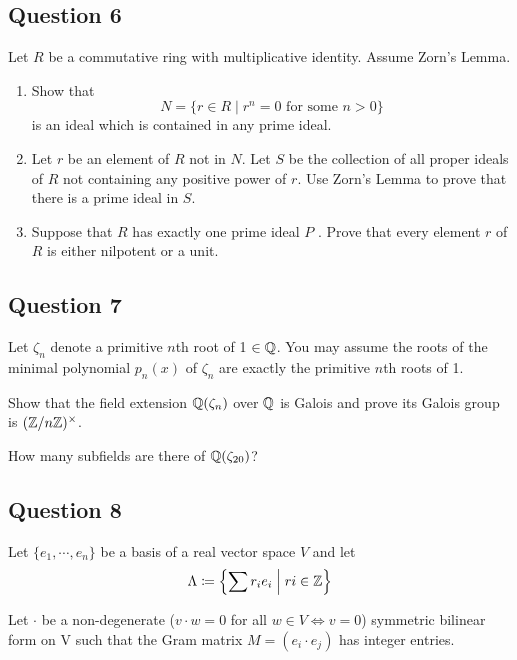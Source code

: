 \documentclass[12pt]{article}
\begin{document}
\hypertarget{question-6}{%
\subsection{Question 6}\label{question-6}}

Let \(R\) be a commutative ring with multiplicative identity. Assume
Zorn's Lemma.

\begin{enumerate}
\def\labelenumi{(\alph{enumi})}
\item
  Show that \[
  N = \{r \in R \mid r^n = 0 \text{ for some } n > 0\}
  \] is an ideal which is contained in any prime ideal.
\item
  Let \(r\) be an element of \(R\) not in \(N\). Let \(S\) be the
  collection of all proper ideals of \(R\) not containing any positive
  power of \(r\). Use Zorn's Lemma to prove that there is a prime ideal
  in \(S\).
\item
  Suppose that \(R\) has exactly one prime ideal \(P\) . Prove that
  every element \(r\) of \(R\) is either nilpotent or a unit.
\end{enumerate}

\hypertarget{question-7}{%
\subsection{Question 7}\label{question-7}}

Let \(\zeta_n\) denote a primitive \(n\)th root of 1 \(\in {\mathbb{Q}}\). You
may assume the roots of the minimal polynomial \(p_n(x)\) of \(\zeta_n\)
are exactly the primitive \(n\)th roots of 1.

Show that the field extension \({\mathbb{Q}}(\zeta_n )\) over \({\mathbb{Q}}\) is Galois
and prove its Galois group is \(({\mathbb{Z}}/n{\mathbb{Z}})^{\times}\).

How many subfields are there of \({\mathbb{Q}}(\zeta_{20} )\)?

\hypertarget{question-8}{%
\subsection{Question 8}\label{question-8}}

Let \(\{e_1, \cdots, e_n \}\) be a basis of a real vector space \(V\)
and let \[
\Lambda \coloneqq \left\{{ \sum r_i e_i \mathrel{\Big|} ri \in {\mathbb{Z}}}\right\}
\]

Let \(\cdot\) be a non-degenerate (\(v \cdot w = 0\) for all
\(w \in V \iff v = 0\)) symmetric bilinear form on V such that the Gram
matrix \(M = (e_i \cdot e_j )\) has integer entries.
\end{document}
